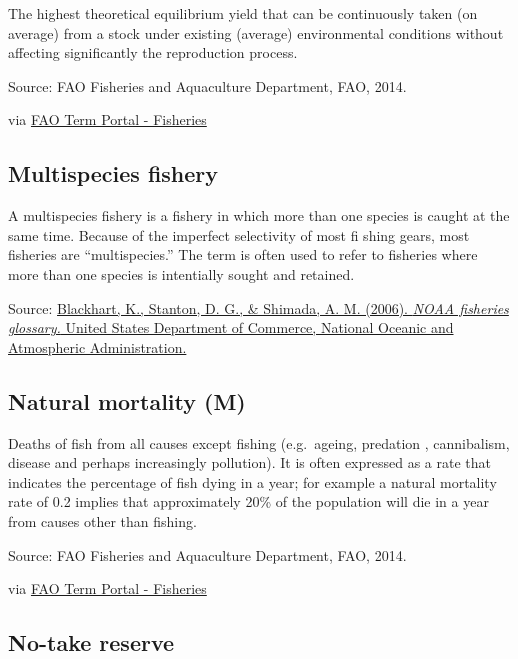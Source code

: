 \documentclass[
  11pt,
]{book}
\begin{document}
The highest theoretical equilibrium yield that can be continuously taken (on average) from a stock under existing (average) environmental conditions without affecting significantly the reproduction process.

Source: FAO Fisheries and Aquaculture Department, FAO, 2014.

via \href{http://www.fao.org/fishery/glossary/en}{FAO Term Portal - Fisheries}

\hypertarget{multispecies-fishery}{%
\subsection{Multispecies fishery}\label{multispecies-fishery}}

A multispecies fishery is a fishery in which more than one species is caught at the same time. Because of the imperfect selectivity of most fi shing gears, most fisheries are ``multispecies.'' The term is often used to refer to fisheries where more than one species is intentially sought and retained.

Source: \href{https://repository.library.noaa.gov/view/noaa/12856}{Blackhart, K., Stanton, D. G., \& Shimada, A. M. (2006). \emph{NOAA fisheries glossary.} United States Department of Commerce, National Oceanic and Atmospheric Administration.}

\hypertarget{natural-mortality-m}{%
\subsection{Natural mortality (M)}\label{natural-mortality-m}}

Deaths of fish from all causes except fishing (e.g.~ageing, predation , cannibalism, disease and perhaps increasingly pollution). It is often expressed as a rate that indicates the percentage of fish dying in a year; for example a natural mortality rate of 0.2 implies that approximately 20\% of the population will die in a year from causes other than fishing.

Source: FAO Fisheries and Aquaculture Department, FAO, 2014.

via \href{http://www.fao.org/fishery/glossary/en}{FAO Term Portal - Fisheries}

\hypertarget{no-take-reserve}{%
\subsection{No-take reserve}\label{no-take-reserve}}
\end{document}
